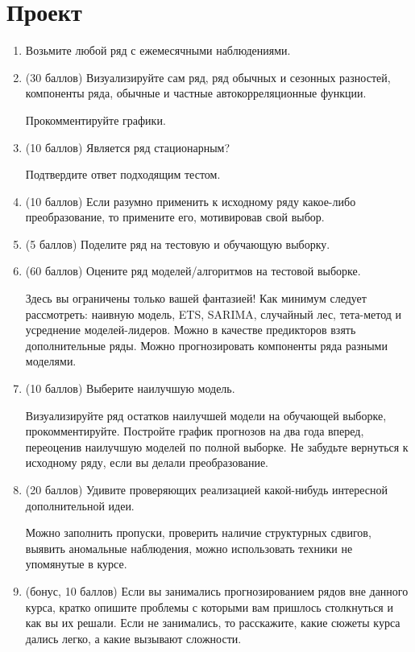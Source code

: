 \documentclass[12pt]{article}
\begin{document}
\section*{Проект}

\begin{enumerate}

\item Возьмите любой ряд с ежемесячными наблюдениями. 

\item (30 баллов) Визуализируйте сам ряд, ряд обычных и сезонных разностей, компоненты ряда,
обычные и частные автокорреляционные функции. 

Прокомментируйте графики. 

\item (10 баллов) Является ряд стационарным? 

Подтвердите ответ подходящим тестом. 

\item (10 баллов) Если разумно применить к исходному ряду какое-либо преобразование, 
то примените его, мотивировав свой выбор. 

\item (5 баллов) Поделите ряд на тестовую и обучающую выборку. 

\item (60 баллов) Оцените ряд моделей/алгоритмов на тестовой выборке. 

Здесь вы ограничены только вашей фантазией!
Как минимум следует рассмотреть: наивную модель, ETS, SARIMA, случайный лес, 
тета-метод и усреднение моделей-лидеров.
Можно в качестве предикторов взять дополнительные ряды. 
Можно прогнозировать компоненты ряда разными моделями. 

\item (10 баллов) Выберите наилучшую модель. 

Визуализируйте ряд остатков наилучшей модели на обучающей выборке, прокомментируйте.
Постройте график прогнозов на два года вперед, переоценив наилучшую моделей по полной выборке.
Не забудьте вернуться к исходному ряду, если вы делали преобразование.


\item (20 баллов) Удивите проверяющих реализацией какой-нибудь интересной дополнительной идеи. 

Можно заполнить пропуски, проверить наличие структурных сдвигов, выявить аномальные наблюдения, 
можно использовать техники не упомянутые в курсе. 

\item (бонус, 10 баллов) Если вы занимались прогнозированием рядов вне данного курса,
кратко опишите проблемы с которыми вам пришлось столкнуться и как вы их решали. 
Если не занимались, то расскажите, какие сюжеты курса дались легко, а какие вызывают сложности. 

    
\end{enumerate}
\end{document}
